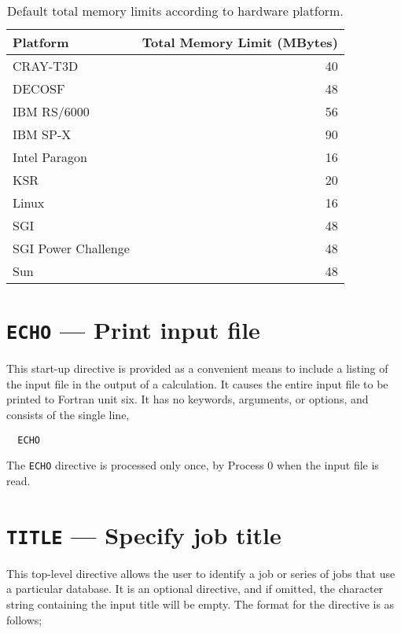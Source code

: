 \begin{table}

\center

\label{tbl:default-memory-limits}

\begin{tabular}{lr}
\hline\hline
Platform        & Total Memory Limit (MBytes) \\
\hline
CRAY-T3D        & 40 \\
DECOSF          & 48 \\
IBM RS/6000     & 56 \\
IBM SP-X        & 90 \\
Intel Paragon   & 16 \\
KSR             & 20 \\
Linux           & 16 \\
SGI             & 48 \\
SGI Power Challenge  & 48 \\
Sun             & 48 \\
\hline\hline
\end{tabular}

\caption{Default total memory limits according to hardware platform.}


\end{table}

\section{{\tt ECHO} --- Print input file}
\label{sec:echo}

This start-up directive is provided as a convenient means to include a
listing of the input file in the output of a calculation.  It causes
the entire input file to be printed to Fortran unit six.  It has no
keywords, arguments, or options, and consists of the single line,

\begin{verbatim}
  ECHO
\end{verbatim}

The \verb+ECHO+ directive is processed only
once, by Process 0 when the input file is read.

\section{{\tt TITLE} --- Specify job title}

This top-level directive allows the user to identify a job or series of 
jobs that use a
particular database.  It is an optional directive, and if omitted, the 
character string containing the input title will be empty.  The format for 
the directive is as follows;

